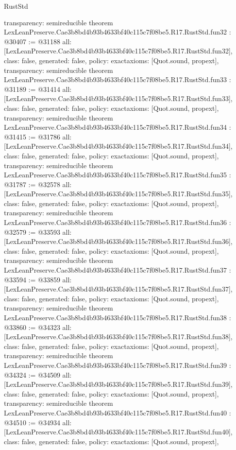 \begin{lexlean}{RustStd}
\begin{coremodule}
{  transparency: semireducible
}
theorem LexLeanPreserve.Cae3b8bd4b93b4633bf40c115c7f08be5.R17.RustStd.fun32 : @30407 := @31188 {
  all: [LexLeanPreserve.Cae3b8bd4b93b4633bf40c115c7f08be5.R17.RustStd.fun32],
  class: false,
  generated: false,
  policy: exact{axioms: [Quot.sound, propext]},
  transparency: semireducible
}
theorem LexLeanPreserve.Cae3b8bd4b93b4633bf40c115c7f08be5.R17.RustStd.fun33 : @31189 := @31414 {
  all: [LexLeanPreserve.Cae3b8bd4b93b4633bf40c115c7f08be5.R17.RustStd.fun33],
  class: false,
  generated: false,
  policy: exact{axioms: [Quot.sound, propext]},
  transparency: semireducible
}
theorem LexLeanPreserve.Cae3b8bd4b93b4633bf40c115c7f08be5.R17.RustStd.fun34 : @31415 := @31786 {
  all: [LexLeanPreserve.Cae3b8bd4b93b4633bf40c115c7f08be5.R17.RustStd.fun34],
  class: false,
  generated: false,
  policy: exact{axioms: [Quot.sound, propext]},
  transparency: semireducible
}
theorem LexLeanPreserve.Cae3b8bd4b93b4633bf40c115c7f08be5.R17.RustStd.fun35 : @31787 := @32578 {
  all: [LexLeanPreserve.Cae3b8bd4b93b4633bf40c115c7f08be5.R17.RustStd.fun35],
  class: false,
  generated: false,
  policy: exact{axioms: [Quot.sound, propext]},
  transparency: semireducible
}
theorem LexLeanPreserve.Cae3b8bd4b93b4633bf40c115c7f08be5.R17.RustStd.fun36 : @32579 := @33593 {
  all: [LexLeanPreserve.Cae3b8bd4b93b4633bf40c115c7f08be5.R17.RustStd.fun36],
  class: false,
  generated: false,
  policy: exact{axioms: [Quot.sound, propext]},
  transparency: semireducible
}
theorem LexLeanPreserve.Cae3b8bd4b93b4633bf40c115c7f08be5.R17.RustStd.fun37 : @33594 := @33859 {
  all: [LexLeanPreserve.Cae3b8bd4b93b4633bf40c115c7f08be5.R17.RustStd.fun37],
  class: false,
  generated: false,
  policy: exact{axioms: [Quot.sound, propext]},
  transparency: semireducible
}
theorem LexLeanPreserve.Cae3b8bd4b93b4633bf40c115c7f08be5.R17.RustStd.fun38 : @33860 := @34323 {
  all: [LexLeanPreserve.Cae3b8bd4b93b4633bf40c115c7f08be5.R17.RustStd.fun38],
  class: false,
  generated: false,
  policy: exact{axioms: [Quot.sound, propext]},
  transparency: semireducible
}
theorem LexLeanPreserve.Cae3b8bd4b93b4633bf40c115c7f08be5.R17.RustStd.fun39 : @34324 := @34509 {
  all: [LexLeanPreserve.Cae3b8bd4b93b4633bf40c115c7f08be5.R17.RustStd.fun39],
  class: false,
  generated: false,
  policy: exact{axioms: [Quot.sound, propext]},
  transparency: semireducible
}
theorem LexLeanPreserve.Cae3b8bd4b93b4633bf40c115c7f08be5.R17.RustStd.fun40 : @34510 := @34934 {
  all: [LexLeanPreserve.Cae3b8bd4b93b4633bf40c115c7f08be5.R17.RustStd.fun40],
  class: false,
  generated: false,
  policy: exact{axioms: [Quot.sound, propext]},
}
\end{coremodule}
\end{lexlean}
